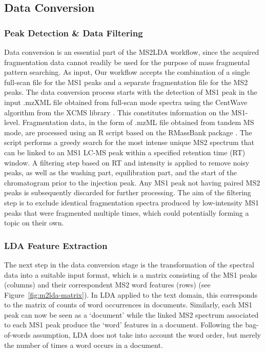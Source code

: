 \subsection{Data Conversion\label{sub:data-conversion}}

\subsubsection{Peak Detection \& Data Filtering}

Data conversion is an essential part of the MS2LDA workflow, since the acquired fragmentation data cannot readily be used for the purpose of mass fragmental pattern searching. As input, Our workflow accepts the combination of a single full-scan file for the MS1 peaks and a separate fragmentation file for the MS2 peaks. The data conversion process starts with the detection of MS1 peak in the input .mzXML file obtained from full-scan mode spectra using the CentWave algorithm from the XCMS library \cite{Smith2006}. This constitutes information on the MS1-level. Fragmentation data, in the form of .mzML file obtained from tandem MS mode, are processed using an R script based on the RMassBank package \cite{Stravs2013}. The script performs a greedy search for the most intense unique MS2 spectrum that can be linked to an MS1 LC-MS peak within a specified retention time (RT) window. A filtering step based on RT and intensity is applied to remove noisy peaks, as well as the washing part, equilibration part, and the start of the chromatogram prior to the injection peak. Any MS1 peak not having paired MS2 peaks is subsequently discarded for further processing. The aim of the filtering step is to exclude identical fragmentation spectra produced by low-intensity MS1 peaks that were fragmented multiple times, which could potentially forming a topic on their own. 

\subsubsection{LDA Feature Extraction}

The next step in the data conversion stage is the transformation of the spectral data into a suitable input format, which is a matrix consisting of the MS1 peaks (columns) and their correspondent MS2 word features (rows) (see Figure~\ref{fig:m2lda-matrix}). In LDA applied to the text domain, this corresponds to the matrix of counts of word occurrences in documents. Similarly, each MS1 peak can now be seen as a ‘document’ while the linked MS2 spectrum associated to each MS1 peak produce the ‘word’ features in a document. Following the bag-of-words assumption, LDA does not take into account the word order, but merely the number of times a word occurs in a document. 

